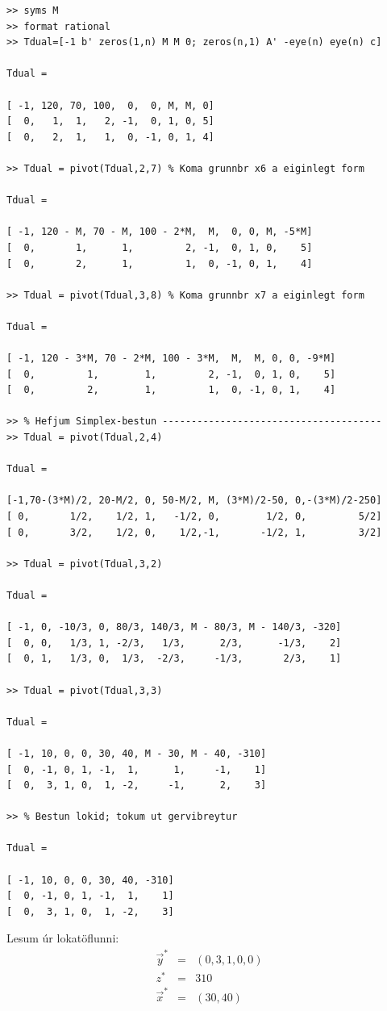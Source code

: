 \begin{lstlisting}
>> syms M
>> format rational
>> Tdual=[-1 b' zeros(1,n) M M 0; zeros(n,1) A' -eye(n) eye(n) c]
 
Tdual =
 
[ -1, 120, 70, 100,  0,  0, M, M, 0]
[  0,   1,  1,   2, -1,  0, 1, 0, 5]
[  0,   2,  1,   1,  0, -1, 0, 1, 4]
 
>> Tdual = pivot(Tdual,2,7) % Koma grunnbr x6 a eiginlegt form
 
Tdual =
 
[ -1, 120 - M, 70 - M, 100 - 2*M,  M,  0, 0, M, -5*M]
[  0,       1,      1,         2, -1,  0, 1, 0,    5]
[  0,       2,      1,         1,  0, -1, 0, 1,    4]
 
>> Tdual = pivot(Tdual,3,8) % Koma grunnbr x7 a eiginlegt form
 
Tdual =
 
[ -1, 120 - 3*M, 70 - 2*M, 100 - 3*M,  M,  M, 0, 0, -9*M]
[  0,         1,        1,         2, -1,  0, 1, 0,    5]
[  0,         2,        1,         1,  0, -1, 0, 1,    4]
 
>> % Hefjum Simplex-bestun --------------------------------------
>> Tdual = pivot(Tdual,2,4)
 
Tdual =
 
[-1,70-(3*M)/2, 20-M/2, 0, 50-M/2, M, (3*M)/2-50, 0,-(3*M)/2-250]
[ 0,       1/2,    1/2, 1,   -1/2, 0,        1/2, 0,         5/2]
[ 0,       3/2,    1/2, 0,    1/2,-1,       -1/2, 1,         3/2]
 
>> Tdual = pivot(Tdual,3,2)
 
Tdual =
 
[ -1, 0, -10/3, 0, 80/3, 140/3, M - 80/3, M - 140/3, -320]
[  0, 0,   1/3, 1, -2/3,   1/3,      2/3,      -1/3,    2]
[  0, 1,   1/3, 0,  1/3,  -2/3,     -1/3,       2/3,    1]
 
>> Tdual = pivot(Tdual,3,3)
 
Tdual =
 
[ -1, 10, 0, 0, 30, 40, M - 30, M - 40, -310]
[  0, -1, 0, 1, -1,  1,      1,     -1,    1]
[  0,  3, 1, 0,  1, -2,     -1,      2,    3]
 
>> % Bestun lokid; tokum ut gervibreytur
 
Tdual =
 
[ -1, 10, 0, 0, 30, 40, -310]
[  0, -1, 0, 1, -1,  1,    1]
[  0,  3, 1, 0,  1, -2,    3] 
\end{lstlisting}
Lesum úr lokatöflunni:
\begin{eqnarray*}
 \vec{y}^* &=& (0, 3, 1,0,0)\\ z^* &=& 310 \\ \vec{x}^* &=&  (30, 40) 
\end{eqnarray*}

